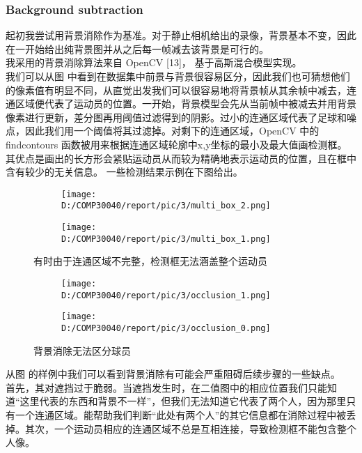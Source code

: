 \documentclass{article}
\begin{document}
\subsubsection{Background subtraction}
起初我尝试用背景消除作为基准。对于静止相机给出的录像，背景基本不变，因此在一开始给出纯背景图并从之后每一帧减去该背景是可行的。\\
我采用的背景消除算法来自 OpenCV [13]， 基于高斯混合模型实现。\\
我们可以从图  中看到在数据集中前景与背景很容易区分，因此我们也可猜想他们的像素值有明显不同，从直觉出发我们可以很容易地将背景帧从其余帧中减去，连通区域便代表了运动员的位置。一开始，背景模型会先从当前帧中被减去并用背景像素进行更新，差分图再用阈值过滤得到的阴影。过小的连通区域代表了足球和噪点，因此我们用一个阈值将其过滤掉。对剩下的连通区域，OpenCV 中的 findcontours 函数被用来根据连通区域轮廓中x,y坐标的最小及最大值画检测框。其优点是画出的长方形会紧贴运动员从而较为精确地表示运动员的位置，且在框中含有较少的无关信息。
一些检测结果示例在下图给出。
\begin{figure}[h!]
  \begin{subfigure}[b]{\linewidth}
  \centering
    \texttt{[image: D:/COMP30040/report/pic/3/multi\_box\_2.png]} 
  \end{subfigure}
  \begin{subfigure}[b]{\linewidth}
  \centering
    \texttt{[image: D:/COMP30040/report/pic/3/multi\_box\_1.png]} 
  \end{subfigure}
  \caption{有时由于连通区域不完整，检测框无法涵盖整个运动员}
\end{figure}
\begin{figure}[h!]
  \centering
  \begin{subfigure}[b]{0.4\linewidth}
    \texttt{[image: D:/COMP30040/report/pic/3/occlusion\_1.png]} 
  \end{subfigure}
  \begin{subfigure}[b]{0.4\linewidth}
    \texttt{[image: D:/COMP30040/report/pic/3/occlusion\_0.png]} 
  \end{subfigure}
  \caption{背景消除无法区分球员}
\end{figure}
从图 的样例中我们可以看到背景消除有可能会严重阻碍后续步骤的一些缺点。\\
首先，其对遮挡过于脆弱。当遮挡发生时，在二值图中的相应位置我们只能知道“这里代表的东西和背景不一样”，但我们无法知道它代表了两个人，因为那里只有一个连通区域。能帮助我们判断“此处有两个人”的其它信息都在消除过程中被丢掉。其次，一个运动员相应的连通区域不总是互相连接，导致检测框不能包含整个人像。\\
\end{document}
